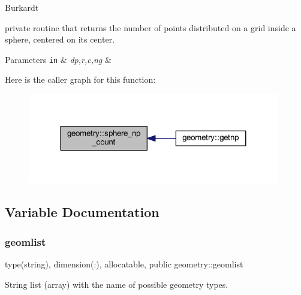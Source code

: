 Burkardt 

private routine that returns the number of points distributed on a grid inside a sphere, centered on its center. 
\begin{DoxyParams}[1]{Parameters}
\mbox{\tt in}  & {\em dp,r,c,ng} & \\
\hline
\end{DoxyParams}
Here is the caller graph for this function\+:
\nopagebreak
\begin{figure}[H]
\begin{center}
\leavevmode
\includegraphics[width=311pt]{namespacegeometry_afb10fc3d303c98de110234acf3615274_icgraph}
\end{center}
\end{figure}


\subsection{Variable Documentation}
\mbox{\label{namespacegeometry_a879bd9ccab6fc42f051bbfc9f0560a62}} 
\subsubsection{\texorpdfstring{geomlist}{geomlist}}
{\footnotesize\ttfamily type(string), dimension(\+:), allocatable, public geometry\+::geomlist}



String list (array) with the name of possible geometry types. 

